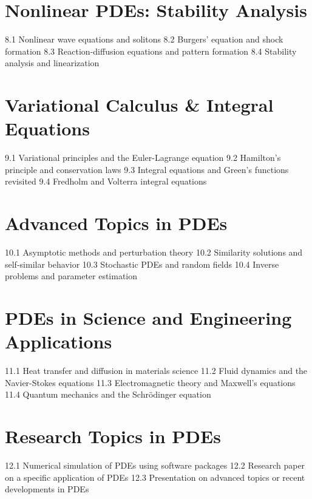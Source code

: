 \section{Nonlinear PDEs: Stability Analysis}
8.1 Nonlinear wave equations and solitons
8.2 Burgers' equation and shock formation
8.3 Reaction-diffusion equations and pattern formation
8.4 Stability analysis and linearization
\section{Variational Calculus \& Integral Equations}
9.1 Variational principles and the Euler-Lagrange equation
9.2 Hamilton's principle and conservation laws
9.3 Integral equations and Green's functions revisited
9.4 Fredholm and Volterra integral equations
\section{Advanced Topics in PDEs}
10.1 Asymptotic methods and perturbation theory
10.2 Similarity solutions and self-similar behavior
10.3 Stochastic PDEs and random fields
10.4 Inverse problems and parameter estimation
\section{PDEs in Science and Engineering Applications}
11.1 Heat transfer and diffusion in materials science
11.2 Fluid dynamics and the Navier-Stokes equations
11.3 Electromagnetic theory and Maxwell's equations
11.4 Quantum mechanics and the Schrödinger equation
\section{Research Topics in PDEs}
12.1 Numerical simulation of PDEs using software packages
12.2 Research paper on a specific application of PDEs
12.3 Presentation on advanced topics or recent developments in PDEs
